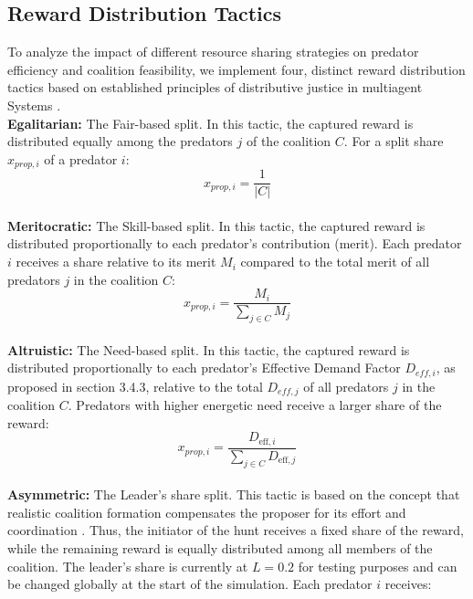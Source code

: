 \documentclass[12pt,a4paper]{report}
\begin{document}
	\subsection{Reward Distribution Tactics}

	To analyze the impact of different resource sharing strategies on predator efficiency and coalition feasibility, we implement four, distinct reward distribution tactics based on established principles of distributive justice in multiagent Systems \cite{Deutsch1975}. \\
	
	\textbf{Egalitarian:} The Fair-based split. In this tactic, the captured reward is distributed equally among the predators $j$ of the coalition $C$. For a split share $x_{prop,i}$ of a predator $i$: \\
	
	\[ x_{prop,i} = \frac{1}{|C|} \] \\
	
	\textbf{Meritocratic:} The Skill-based split. In this tactic, the captured reward is distributed proportionally to each predator's contribution (merit). Each predator $i$ receives a share relative to its merit $M_i$ compared to the total merit of all predators $j$ in the coalition $C$: \\
	
	\[ x_{prop,i} = \frac{M_i}{\sum_{j \in C} M_j} \] \\
	
	\textbf{Altruistic:} The Need-based split. In this tactic, the captured reward is distributed proportionally to each predator's Effective Demand Factor $D_{eff,i}$, as proposed in section 3.4.3, relative to the total $D_{eff,j}$ of all predators $j$ in the coalition $C$. Predators with higher energetic need receive a larger share of the reward: \\
	
	\[ x_{prop,i} = \frac{D_{\text{eff},i}}{\sum_{j \in C} D_{\text{eff},j}} \] \\
	
	\textbf{Asymmetric:} The Leader's share split. This tactic is based on the concept that realistic coalition formation compensates the proposer for its effort and coordination \cite{Chalkiadakis2011}. Thus, the initiator of the hunt receives a fixed share of the reward, while the remaining reward is equally distributed among all members of the coalition. The leader's share is currently at $L = 0.2$ for testing purposes and can be changed globally at the start of the simulation. Each predator $i$ receives: \\
	
\end{document}
